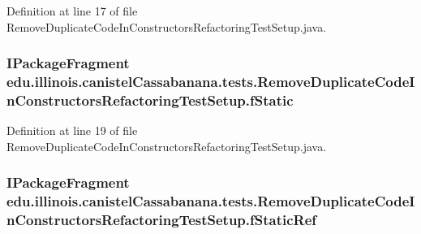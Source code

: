 Definition at line 17 of file RemoveDuplicateCodeInConstructorsRefactoringTestSetup.java.

\hypertarget{classedu_1_1illinois_1_1canistelCassabanana_1_1tests_1_1RemoveDuplicateCodeInConstructorsRefactoringTestSetup_a46435fa8daac96d40f1be8e638df6d4e}{
\subsubsection[{fStatic}]{\setlength{\rightskip}{0pt plus 5cm}IPackageFragment {\bf edu.illinois.canistelCassabanana.tests.RemoveDuplicateCodeInConstructorsRefactoringTestSetup.fStatic}}}
\label{classedu_1_1illinois_1_1canistelCassabanana_1_1tests_1_1RemoveDuplicateCodeInConstructorsRefactoringTestSetup_a46435fa8daac96d40f1be8e638df6d4e}


Definition at line 19 of file RemoveDuplicateCodeInConstructorsRefactoringTestSetup.java.

\hypertarget{classedu_1_1illinois_1_1canistelCassabanana_1_1tests_1_1RemoveDuplicateCodeInConstructorsRefactoringTestSetup_ac1eec28ae69c00995fd82d6182c27ab9}{
\subsubsection[{fStaticRef}]{\setlength{\rightskip}{0pt plus 5cm}IPackageFragment {\bf edu.illinois.canistelCassabanana.tests.RemoveDuplicateCodeInConstructorsRefactoringTestSetup.fStaticRef}}}
\label{classedu_1_1illinois_1_1canistelCassabanana_1_1tests_1_1RemoveDuplicateCodeInConstructorsRefactoringTestSetup_ac1eec28ae69c00995fd82d6182c27ab9}


